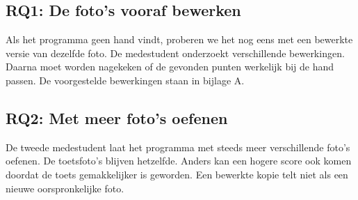\subsection{RQ1: De foto's vooraf bewerken}
Als het programma geen hand vindt, proberen we het nog eens met een bewerkte versie van dezelfde foto. De medestudent onderzoekt verschillende bewerkingen. Daarna moet worden nagekeken of de gevonden punten werkelijk bij de hand passen. De voorgestelde bewerkingen staan in bijlage A.

\subsection{RQ2: Met meer foto's oefenen}
De tweede medestudent laat het programma met steeds meer verschillende foto's oefenen. De toetsfoto's blijven hetzelfde. Anders kan een hogere score ook komen doordat de toets gemakkelijker is geworden. Een bewerkte kopie telt niet als een nieuwe oorspronkelijke foto.
